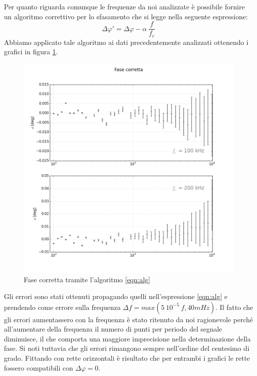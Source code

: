 \documentclass[journal, a4paper]{IEEEtran}
\begin{document}
Per quanto riguarda comunque le frequenze da noi analizzate è possibile fornire un algoritmo correttivo per lo sfasamento che si legge nella seguente espressione:
\begin{equation}
\label{eqn:alg}
\Delta \varphi ' = \Delta \varphi - \alpha ~ \frac{f}{f_c}
\end{equation}
Abbiamo applicato tale algoritmo ai dati precedentemente analizzati ottenendo i grafici in figura \ref{fig:suberr}.

\begin{figure}[htp]
\centering
\includegraphics[scale=.3]{subplots_errors}
\caption{Fase corretta tramite l'algoritmo \ref{eqn:alg}}
\label{fig:suberr}
\end{figure}

Gli errori sono stati ottenuti propagando quelli nell'espressione \ref{eqn:alg} e prendendo come errore sulla frequenza $\Delta f = max(5~10^{-5}~f, 40 mHz)$. Il fatto che gli errori aumentassero con la frequenza è stato ritenuto da noi ragionevole perché all'aumentare della frequenza il numero di punti per periodo del segnale diminuisce, il che comporta una maggiore imprecisione nella determinazione della fase. Si noti tuttavia che gli errori rimangono sempre nell'ordine del centesimo di grado. Fittando con rette orizzontali è risultato che per entrambi i grafici le rette fossero compatibili con $ \Delta \varphi =0$.
\end{document}
